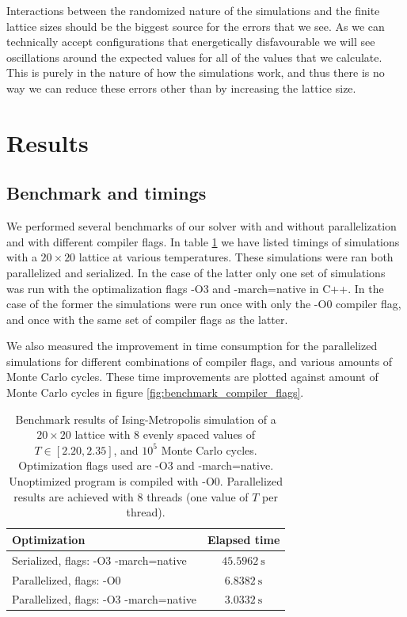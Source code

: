 \documentclass[reprint,english,notitlepage]{revtex4-1}  %
\begin{document}
Interactions between the randomized nature of the simulations and the finite lattice sizes should be the biggest source for the errors that we see. As we can technically accept configurations that energetically disfavourable we will see oscillations around the expected values for all of the values that we calculate. This is purely in the nature of how the simulations work, and thus there is no way we can reduce these errors other than by increasing the lattice size. 



\newpage

\section{Results} \label{sec:IV}

\subsection{Benchmark and timings} \label{sec:IV:A}

We performed several benchmarks of our solver with and without parallelization and with different compiler flags. In table \ref{table:benchmark_parallel} we have listed timings of simulations with a $20 \times 20$ lattice at various temperatures. These simulations were ran both parallelized and serialized. In the case of the latter only one set of simulations was run with the optimalization flags -O3 and -march=native in C++. In the case of the former the simulations were run once with only the -O0 compiler flag, and once with the same set of compiler flags as the latter.

We also measured the improvement in time consumption for the parallelized simulations for different combinations of compiler flags, and various amounts of Monte Carlo cycles. These time improvements are plotted against amount of Monte Carlo cycles in figure \ref{fig:benchmark_compiler_flags}.

\begin{table}[H]
	\centering
	\begin{tabular}{|l|c|}
		\hline
		Optimization & Elapsed time \\
		\hline
		Serialized, flags: -O3 -march=native & \(\SI{45.5962}{\second}\) \\
		Parallelized, flags: -O0 & \(\SI{6.8382}{\second}\) \\
		Parallelized, flags: -O3 -march=native & \(\SI{3.0332}{\second}\) \\
		\hline
	\end{tabular}
	\label{table:benchmark_parallel}
	\caption{Benchmark results of Ising-Metropolis simulation of a \(20\times 20\) lattice with \(8\) evenly spaced values of \(T \in [2.20, 2.35]\), and \(10^{5}\) Monte Carlo cycles. Optimization flags used are -O3 and -march=native. Unoptimized program is compiled with -O0. Parallelized results are achieved with \(8\) threads (one value of \(T\) per thread).}
\end{table}
\end{document}
